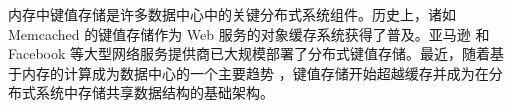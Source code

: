%
%
%
%
%
%
%
%
%
%
%
%







\iffalse
内存中键值存储是许多数据中心中的关键分布式系统组件。历史上，诸如 Memcached \cite {fitzpatrick2004distributed}的键值存储作为 Web 服务的对象缓存系统获得了普及。亚马逊 \cite {decandia2007dynamo} 和 Facebook \cite {atikoglu2012workload,nishtala2013scaling} 等大型网络服务提供商已大规模部署了分布式键值存储。最近，随着基于内存的计算成为数据中心的一个主要趋势 \cite{ousterhout2010case,dragojevic2014farm}，键值存储开始超越缓存并成为在分布式系统中存储共享数据结构的基础架构。

